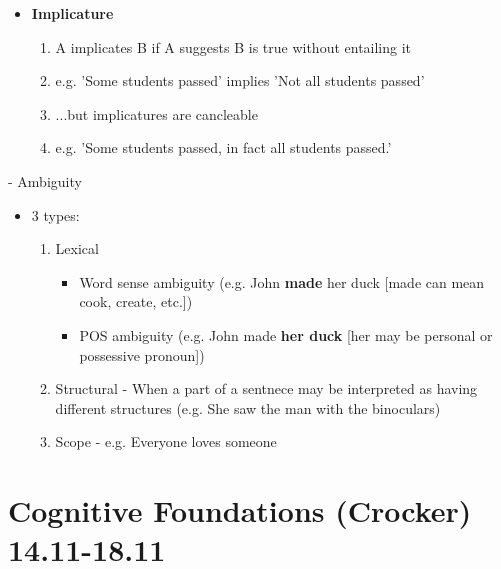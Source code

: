 \documentclass[11pt]{article}
\newenvironment{itemise}{
\begin{itemize}
  \setlength{\itemsep}{1pt}
  \setlength{\parskip}{0pt}
  \setlength{\parsep}{0pt}
}{\end{itemize}}
\begin{document}
\begin{itemise}
\begin{itemise}
\begin{itemise}
\begin{itemise}
\begin{enumerate}
	  \begin{enumerate}
	   \item Lexical triggers: (regret, realize, know, stop, start, blame, fault)
	   \item Cleft constructions: (It was John that ate the sandwhich -> Someone ate the sandwhich)
	  \end{enumerate}
	 \item Words can have presuppositions (A sleeps -> A is capble of sleeping [c.f. green ideas sleep furiously])
	\end{enumerate}
       \item {\bf Implicature}
	\begin{enumerate}
	 \item A implicates B if A suggests B is true without entailing it
	 \item e.g. 'Some students passed' implies 'Not all students passed'
         \item ...but implicatures are cancleable
	 \item e.g. 'Some students passed, in fact all students passed.'
	\end{enumerate}
      \end{itemise}
    \end{itemise}
  \end{itemise}
\end{itemise}
- Ambiguity
\begin{itemise}
 \item 3 types:
  \begin{enumerate}
   \item Lexical
    \begin{itemise}
     \item Word sense ambiguity (e.g. John {\bf made} her duck [made can mean cook, create, etc.])
     \item POS ambiguity (e.g. John made {\bf her duck} [her may be personal or possessive pronoun])
    \end{itemise}
   \item Structural - When a part of a sentnece may be interpreted as having different structures (e.g. She saw the man with the binoculars)
   \item Scope - e.g. Everyone loves someone
  \end{enumerate}

\end{itemise}



\section{ Cognitive Foundations (Crocker) 14.11-18.11}
\end{document}
